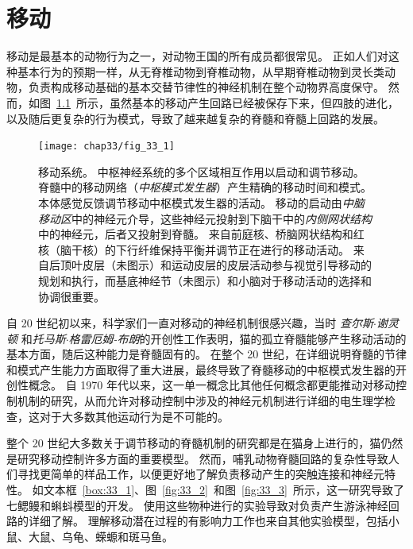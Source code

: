 \chapter{移动} \label{chap:chap33}

移动是最基本的动物行为之一，对动物王国的所有成员都很常见。
正如人们对这种基本行为的预期一样，从无脊椎动物到脊椎动物，从早期脊椎动物到灵长类动物，负责构成移动基础的基本交替节律性的神经机制在整个动物界高度保守。
然而，如图~\ref{fig:33_1}~所示，虽然基本的移动产生回路已经被保存下来，但四肢的进化，以及随后更复杂的行为模式，导致了越来越复杂的脊髓和脊髓上回路的发展。


\begin{figure}[htbp]
	\centering
	\texttt{[image: chap33/fig\_33\_1]}
	\caption{移动系统。
	中枢神经系统的多个区域相互作用以启动和调节移动。
	脊髓中的移动网络（\textit{中枢模式发生器}）产生精确的移动时间和模式。
	本体感觉反馈调节移动中枢模式发生器的活动。
	移动的启动由\textit{中脑移动区}中的神经元介导，这些神经元投射到下脑干中的\textit{内侧网状结构}中的神经元，后者又投射到脊髓。
	来自前庭核、桥脑网状结构和红核（脑干核）的下行纤维保持平衡并调节正在进行的移动活动。
	来自后顶叶皮层（未图示）和运动皮层的皮层活动参与视觉引导移动的规划和执行，而基底神经节（未图示）和小脑对于移动活动的选择和协调很重要。}
	\label{fig:33_1}
\end{figure}


自 20 世纪初以来，科学家们一直对移动的神经机制很感兴趣，当时 \textit{查尔斯$\cdot$谢灵顿} 和\textit{托马斯$\cdot$格雷厄姆-布朗}的开创性工作表明，猫的孤立脊髓能够产生移动活动的基本方面，随后这种能力是脊髓固有的。
在整个 20 世纪，在详细说明脊髓的节律和模式产生能力方面取得了重大进展，最终导致了脊髓移动的中枢模式发生器的开创性概念。
自 1970 年代以来，这一单一概念比其他任何概念都更能推动对移动控制机制的研究，从而允许对移动控制中涉及的神经元机制进行详细的电生理学检查，这对于大多数其他运动行为是不可能的。


整个 20 世纪大多数关于调节移动的脊髓机制的研究都是在猫身上进行的，猫仍然是研究移动控制许多方面的重要模型。
然而，哺乳动物脊髓回路的复杂性导致人们寻找更简单的样品工作，以便更好地了解负责移动产生的突触连接和神经元特性。
如文本框~\ref{box:33_1}、图~\ref{fig:33_2}~和图~\ref{fig:33_3}~所示，这一研究导致了七鳃鳗和蝌蚪模型的开发。
使用这些物种进行的实验导致对负责产生游泳神经回路的详细了解。
理解移动潜在过程的有影响力工作也来自其他实验模型，包括小鼠、大鼠、乌龟、蝾螈和斑马鱼。



